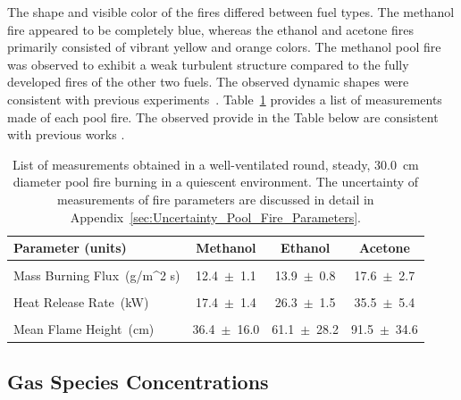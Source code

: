 \documentclass[12pt]{article}
\begin{document}
The shape and visible color of the fires differed between fuel types. The methanol fire appeared to be completely blue, whereas the ethanol and acetone fires primarily consisted of vibrant yellow and orange colors. The methanol pool fire was observed to exhibit a weak turbulent structure compared to the fully developed fires of the other two fuels. The observed dynamic shapes were consistent with previous experiments~\cite{Hamins2016,Hamins1994,Hamins1991,Hamins1996,Lock2008}. Table~\ref{tab:Pool_Fire_Parameters_Table} provides a list of measurements made of each pool fire. The observed provide in the Table below are consistent with previous works \cite{Kim2019}. 

\begin{table}[!]
\caption{List of measurements obtained in a well-ventilated round, steady, 30.0~\si{cm} diameter pool fire burning in a quiescent environment. The uncertainty of measurements of fire parameters are discussed in detail in Appendix~\ref{sec:Uncertainty_Pool_Fire_Parameters}.}
\label{tab:Pool_Fire_Parameters_Table}
\centering
	\footnotesize
	\begin{tabular}{lccc}
\hline
\textbf{Parameter (units)} &\textbf{Methanol}& \textbf{Ethanol}& \textbf{Acetone}\\
\hline
\\[0.01cm]
Mass Burning Flux~(\si{g/{m^2 s}})		&	12.4~$\pm$~1.1		&	13.9~$\pm$~0.8	&	17.6~$\pm$~2.7\\
\\[0.01cm]
Heat Release Rate~(\si{kW})			&	17.4~$\pm$~1.4		&	26.3~$\pm$~1.5	&	35.5~$\pm$~5.4\\
\\[0.01cm]
Mean Flame Height~(\si{cm})			&	36.4~$\pm$~16.0		&	61.1~$\pm$~28.2	&	91.5~$\pm$~34.6\\
\hline
\end{tabular}
\end{table}




\subsection{Gas Species Concentrations}
\label{ssec:Gas_Species_Concentrations}
\end{document}
